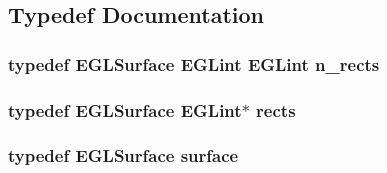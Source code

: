 \subsection{Typedef Documentation}
\hypertarget{simple-egl_8c_aa6a11810244355f89e6c4961b9dd3b53}{
\subsubsection[{n\-\_\-rects}]{\setlength{\rightskip}{0pt plus 5cm}typedef E\-G\-L\-Surface E\-G\-Lint E\-G\-Lint {\bf n\-\_\-rects}}}\label{simple-egl_8c_aa6a11810244355f89e6c4961b9dd3b53}
\hypertarget{simple-egl_8c_a56616f7ca3fc53c0da41d05de9330b11}{
\subsubsection[{rects}]{\setlength{\rightskip}{0pt plus 5cm}typedef E\-G\-L\-Surface E\-G\-Lint$\ast$ {\bf rects}}}\label{simple-egl_8c_a56616f7ca3fc53c0da41d05de9330b11}
\hypertarget{simple-egl_8c_a0720952aa1caded45b5bcdce589663a9}{
\subsubsection[{surface}]{\setlength{\rightskip}{0pt plus 5cm}typedef E\-G\-L\-Surface {\bf surface}}}\label{simple-egl_8c_a0720952aa1caded45b5bcdce589663a9}


